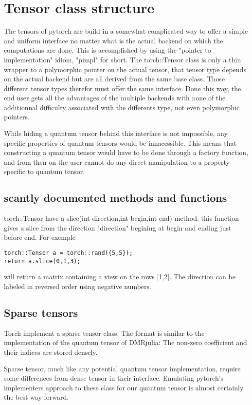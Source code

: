\documentclass[15pt]{article}
\begin{document}
\section{Tensor class structure}

The tensors of pytorch are build in a somewhat complicated way to offer a simple and uniform interface no matter what is the actual backend on which the computations are done.
This is accomplished by using the "pointer to implementation" idiom, "pimpl" for short. The torch::Tensor class is only a thin wrapper to a polymorphic pointer on the actual tensor, that tensor type depends on the actual backend but are all derived from the same base class. Those different tensor types therefor must offer the same interface.
Done this way, the end user gets all the advantages of the multiple backends with none of the additionnal difficulty associated with the differents type, not even polymorphic pointers.

While hiding a quantum tensor behind this interface is not impossible, any specific properties of quantum tensors would be innacessible. This means that constructing a quantum tensor would have to be done through a factory function, and from then on the user cannot do any direct manipulation to a property specific to quantum tensor.

\subsection{scantly documented methods and functions}
torch::Tensor have a slice(int direction,int begin,int end) method. this function gives a slice from the direction "direction" begining at begin and ending just before end.
For exemple
\begin{verbatim}
torch::Tensor a = torch::rand({5,5});
return a.slice(0,1,3); 
\end{verbatim}
will return a matrix containing a view on the rows [1,2].
The direction can be labeled in reversed order using negative numbers.


\subsection{Sparse tensors}
Torch implement a sparse tensor class. The format is similar to the implementation of the quantum tensor of DMRjulia: The non-zero coefficient and their indices are stored densely.

Sparse tensor, much like any potential quantum tensor implementation, require some differences from dense tensor in their interface. Emulating pytorch's implementers approach to these class for our quantum tensor is almost certainly the best way forward.
\end{document}
